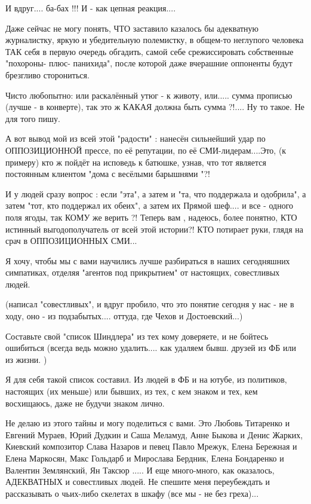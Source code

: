 И вдруг.... ба-бах !!! И - как цепная реакция....

Даже сейчас не могу понять, ЧТО заставило казалось бы адекватную журналистку,
яркую и убедительную полемистку, в общем-то неглупого человека ТАК себя в
первую очередь обгадить, самой себе срежиссировать собственные "похороны- плюс-
панихида", после которой даже вчерашние оппоненты будут брезгливо сторониться. 

Чисто любопытно: или раскалённый утюг - к животу, или..... сумма прописью
(лучше - в конверте), так это ж КАКАЯ должна быть сумма ?!.... Ну то такое. Не
для того пишу. 

А вот вывод мой из всей этой "радости" : нанесён сильнейший удар по
ОППОЗИЦИОННОЙ прессе, по её репутации, по её СМИ-лидерам....Это, (к примеру)
кто ж пойдёт на исповедь к батюшке, узнав, что тот является постоянным клиентом
"дома с весёлыми барышнями "?! 

И у людей сразу вопрос : если "эта", а затем и "та, что поддержала и одобрила",
а затем "тот, кто поддержал их обеих", а затем их Прямой шеф.... и все - одного
поля ягоды, так КОМУ же верить ?! Теперь вам , надеюсь, более понятно, КТО
истинный выгодополучатель от всей этой истории?!  КТО потирает руки, глядя на
срач в ОППОЗИЦИОННЫХ СМИ... 

Я хочу, чтобы мы с вами научились лучше разбираться в наших сегодняшних
симпатиках,  отделяя "агентов под прикрытием" от настоящих, совестливых людей. 

(написал "совестливых", и вдруг пробило, что это понятие сегодня у нас - не в ходу, оно - из подзабытых.... 
оттуда, где Чехов и Достоевский...)

Составьте свой "список Шиндлера" из тех кому доверяете, и не бойтесь ошибиться
(всегда ведь можно удалить.... как удаляем бывш. друзей из ФБ или из жизни. )

Я для себя такой список составил. Из людей в ФБ и на ютубе, из политиков,
настоящих (их меньше) или бывших, из тех, с кем знаком и тех, кем восхищаюсь,
даже не будучи знаком лично. 

Не делаю из этого тайны и могу поделиться с вами. Это Любовь Титаренко и
Евгений Мураев, Юрий Дудкин и Саша Меламуд, Анне Быкова и Денис Жарких,
Киевский композитор Слава Назаров и певец Павло Мрежук, Елена Бережная и Елена
Маркосян, Макс Гольдарб и Мирослава Бердник,  Елена Бондаренко и Валентин
Землянский, Ян Таксюр ..... И еще много-много, как оказалось, АДЕКВАТНЫХ и
совестливых людей. Не спешите меня переубеждать и рассказывать о чьих-либо
скелетах в шкафу (все мы - не без греха)... 

